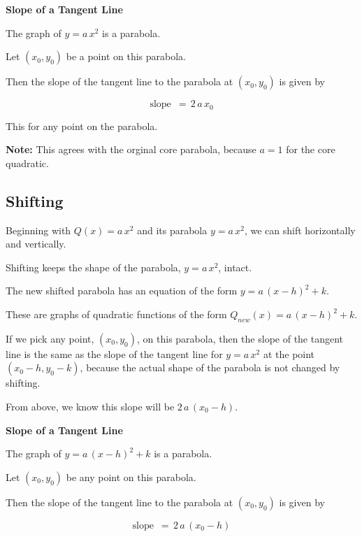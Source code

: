 \documentclass{ximera}
\begin{document}
\begin{conclusion} \textbf{\textcolor{green!25!black}{Slope of a Tangent Line}} 


The graph of $y = a \, x^2$ is a parabola.

Let $(x_0, y_0)$ be a point on this parabola.

Then the slope of the tangent line to the parabola at $(x_0, y_0)$ is given by 



\[ \text{slope } \, = \, 2 \, a \, x_0  \]


\end{conclusion}
This for any point on the parabola.

\textbf{Note:} This agrees with the orginal core parabola, because $a = 1$ for the core quadratic.




















\subsection*{Shifting}




Beginning with $Q(x) = a \, x^2$ and its parabola $y = a \, x^2$, we can shift horizontally and vertically. 





Shifting keeps the shape of the parabola, $y = a \, x^2$, intact. 


The new shifted parabola has an equation of the form $y = a \, (x - h)^2 + k$.

These are graphs of quadratic functions of the form $Q_{new}(x) = a \, (x - h)^2 + k$. 


If we pick any point, $(x_0, y_0)$, on this parabola, then the slope of the tangent line is the same as the slope of the tangent line for $y = a \, x^2$ at the point $(x_0 - h, y_0 - k)$, because the actual shape of the parabola is not changed by shifting.  

From above, we know this slope will be \textbf{$2 \, a \, (x_0 - h)$}.






\begin{conclusion} \textbf{\textcolor{green!25!black}{Slope of a Tangent Line}} 


The graph of $y = a \, (x - h)^2 + k$ is a parabola.

Let $(x_0, y_0)$ be any point on this parabola.

Then the slope of the tangent line to the parabola at $(x_0, y_0)$ is given by 



\[ \text{slope } \, = \, 2 \, a \, (x_0 - h)  \]


\end{conclusion}
\end{document}
